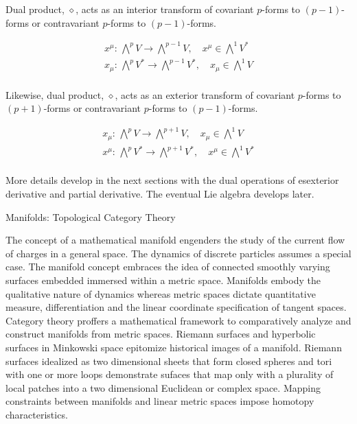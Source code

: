 \documentclass[aps,twocolumn,secnumarabic,nobalancelastpage,amsmath,amssymb,
amsthm,nofootinbib,parskip=full]{revtex4}
\numberwithin{equation}{section}
\newcommand{\mapfab}[3]{{#1}:\,{#2}\longrightarrow {#3}}
\newcommand{\pa}[1]{\left(#1\right)}
\begin{document}
Dual product, $\diamond$, acts as an interior transform of
covariant $p$-forms to
$\pa{p-1}$-forms or contravariant $p$-forms to $\pa{p-1}$-forms.

\begin{equation*}
\begin{array}{c}
\mapfab{x^\mu}{{\bigwedge}^p V}{{\bigwedge}^{p-1} V},
  \quad x^\mu\in{\bigwedge}^1 V^* \\[7pt]
\mapfab{x_\mu}{{\bigwedge}^p V^*}{{\bigwedge}^{p-1} V^*},
  \quad x_\mu\in{\bigwedge}^1 V \\[7pt]
\end{array}
\end{equation*}

Likewise, dual product, $\diamond$, acts as an exterior transform of
covariant $p$-forms to
$\pa{p+1}$-forms or contravariant $p$-forms to $\pa{p-1}$-forms.

\begin{equation*}
\begin{array}{c}
\mapfab{x_\mu}{{\bigwedge}^p V}{{\bigwedge}^{p+1} V},
  \quad x_\mu\in{\bigwedge}^1 V \\[7pt]
\mapfab{x^\mu}{{\bigwedge}^p V^*}{{\bigwedge}^{p+1} V^*},
  \quad x^\mu\in{\bigwedge}^1 V^* \\[7pt]
\end{array}
\end{equation*}

More details develop in the next sections with the
dual operations of esexterior derivative
and partial derivative. The eventual Lie algebra develops later.

Manifolds: Topological Category Theory

The concept of a mathematical manifold engenders the study of the
current flow of charges in a general space.
The dynamics of discrete particles assumes a special case.
The manifold concept embraces the idea of connected smoothly varying surfaces
embedded immersed within a metric space.
Manifolds embody the qualitative nature of dynamics whereas
metric spaces dictate quantitative measure, differentiation and
the linear coordinate specification of tangent spaces.
Category theory proffers a mathematical
framework to comparatively analyze and construct manifolds from metric spaces.
Riemann surfaces and hyperbolic surfaces in Minkowski space
epitomize historical images of a manifold.
Riemann surfaces idealized as two dimensional sheets
that form closed spheres and tori with one or more loops
demonstrate sufaces that map only with a plurality of local patches into a
two dimensional Euclidean or complex space.
Mapping constraints between manifolds and linear metric spaces
impose homotopy characteristics.
\end{document}
